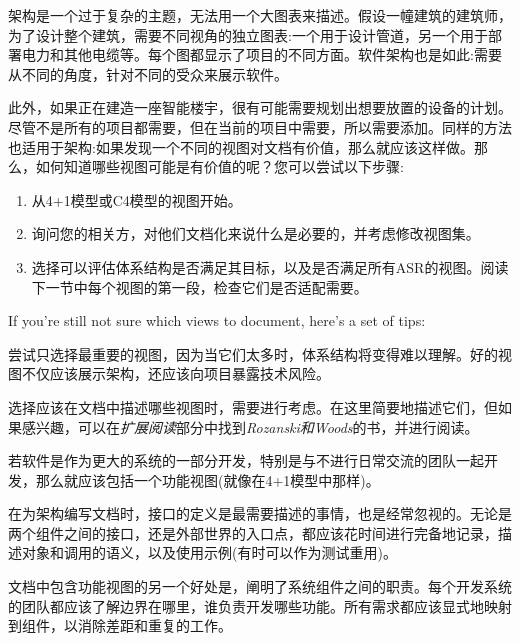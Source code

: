 
架构是一个过于复杂的主题，无法用一个大图表来描述。假设一幢建筑的建筑师，为了设计整个建筑，需要不同视角的独立图表:一个用于设计管道，另一个用于部署电力和其他电缆等。每个图都显示了项目的不同方面。软件架构也是如此:需要从不同的角度，针对不同的受众来展示软件。

此外，如果正在建造一座智能楼宇，很有可能需要规划出想要放置的设备的计划。尽管不是所有的项目都需要，但在当前的项目中需要，所以需要添加。同样的方法也适用于架构:如果发现一个不同的视图对文档有价值，那么就应该这样做。那么，如何知道哪些视图可能是有价值的呢？您可以尝试以下步骤:

\begin{enumerate}
\item
从4+1模型或C4模型的视图开始。

\item 
询问您的相关方，对他们文档化来说什么是必要的，并考虑修改视图集。

\item
选择可以评估体系结构是否满足其目标，以及是否满足所有ASR的视图。阅读下一节中每个视图的第一段，检查它们是否适配需要。
\end{enumerate}

If you're still not sure which views to document, here's a set of tips:

\begin{tcolorbox}[colback=webgreen!5!white,colframe=webgreen!75!black, title=TIP]
\hspace*{0.7cm}尝试只选择最重要的视图，因为当它们太多时，体系结构将变得难以理解。好的视图不仅应该展示架构，还应该向项目暴露技术风险。
\end{tcolorbox}

选择应该在文档中描述哪些视图时，需要进行考虑。在这里简要地描述它们，但如果感兴趣，可以在\textit{扩展阅读}部分中找到\textit{Rozanski和Woods}的书，并进行阅读。


若软件是作为更大的系统的一部分开发，特别是与不进行日常交流的团队一起开发，那么就应该包括一个功能视图(就像在4+1模型中那样)。

在为架构编写文档时，接口的定义是最需要描述的事情，也是经常忽视的。无论是两个组件之间的接口，还是外部世界的入口点，都应该花时间进行完备地记录，描述对象和调用的语义，以及使用示例(有时可以作为测试重用)。

文档中包含功能视图的另一个好处是，阐明了系统组件之间的职责。每个开发系统的团队都应该了解边界在哪里，谁负责开发哪些功能。所有需求都应该显式地映射到组件，以消除差距和重复的工作。

